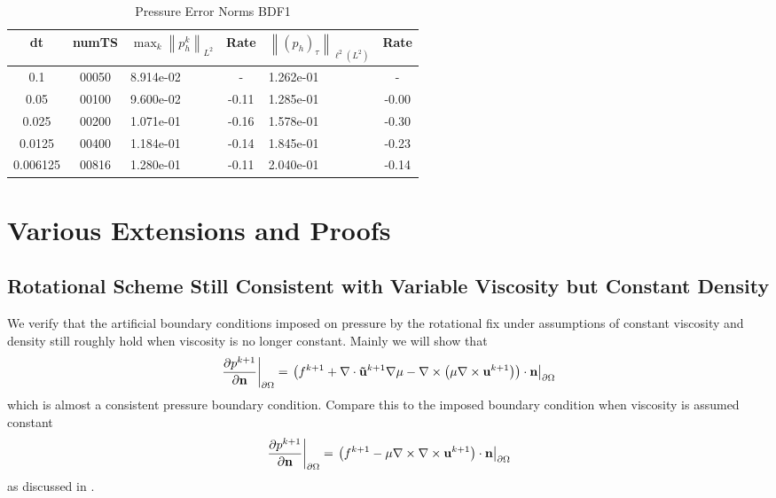 \documentclass[letterpaper]{erdc}
\begin{document}
\begin{table}[h!]
  \begin{center}
    \caption{Pressure Error Norms BDF1}
    \begin{tabular}{c|c|l|c|l|c}
      dt & numTS &  $\displaystyle\max_{k} \left\|p^{k}_{h}\right\|_{L^2}$ &  Rate  &  $\left\|\left(p_h\right)_{\tau}\right\|_{\ell^2(L^2)}$  &  Rate\\
      \hline
      0.1     & 00050 &  8.914e-02  &  -  & 1.262e-01 &  -\\
      0.05    & 00100 &  9.600e-02  & -0.11  & 1.285e-01 & -0.00\\
      0.025   & 00200 &  1.071e-01  & -0.16  & 1.578e-01 & -0.30\\
      0.0125  & 00400 &  1.184e-01  & -0.14  & 1.845e-01 & -0.23\\
      0.006125 & 00816 &  1.280e-01  & -0.11  & 2.040e-01 & -0.14
    \end{tabular}
  \end{center}
\end{table}

\appendix
\chapter{Various Extensions and Proofs}

\section{Rotational Scheme Still Consistent with Variable Viscosity but Constant Density}
We verify that the artificial boundary conditions imposed on pressure by the rotational fix under assumptions of constant viscosity and density still roughly hold when viscosity is no longer constant.  Mainly we will show that 
\begin{equation}
  \left.\frac{\partial p^{k+1}}{\partial \textbf{n}}\right|_{\partial\Omega} = \left.\left(f^{k+1} + \nabla\cdot\mathbf{\tilde{u}}^{k+1}\nabla\mu - \nabla\times\left(\mu\nabla\times \textbf{u}^{k+1}  \right)  \right)\cdot \textbf{n}\right|_{\partial\Omega}
\end{equation}
which is almost a consistent pressure boundary condition.  Compare this to the imposed boundary condition when viscosity is assumed constant
\begin{equation}
  \left.\frac{\partial p^{k+1}}{\partial \textbf{n}}\right|_{\partial\Omega} = \left.\left(f^{k+1} - \mu\nabla\times\nabla\times \textbf{u}^{k+1} \right)\cdot \textbf{n}\right|_{\partial\Omega}
\end{equation}
 as discussed in \cite{guermond2004error}.  
 
\end{document}
